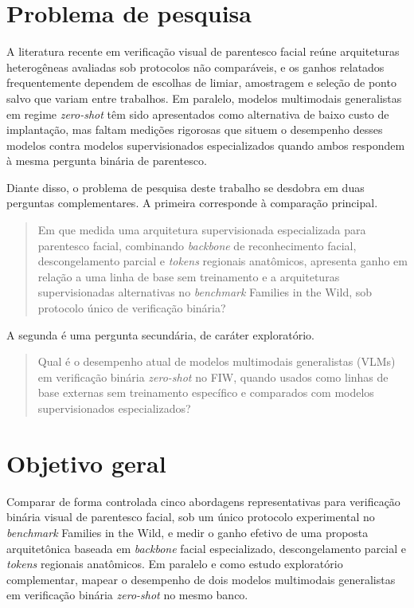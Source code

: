 \section{Problema de pesquisa}

A literatura recente em verificação visual de parentesco facial reúne arquiteturas heterogêneas avaliadas sob protocolos não comparáveis, e os ganhos relatados frequentemente dependem de escolhas de limiar, amostragem e seleção de ponto salvo que variam entre trabalhos. Em paralelo, modelos multimodais generalistas em regime \textit{zero-shot} têm sido apresentados como alternativa de baixo custo de implantação, mas faltam medições rigorosas que situem o desempenho desses modelos contra modelos supervisionados especializados quando ambos respondem à mesma pergunta binária de parentesco.

Diante disso, o problema de pesquisa deste trabalho se desdobra em duas perguntas complementares. A primeira corresponde à comparação principal.

\begin{quote}
\noindent Em que medida uma arquitetura supervisionada especializada para parentesco facial, combinando \textit{backbone} de reconhecimento facial, descongelamento parcial e \textit{tokens} regionais anatômicos, apresenta ganho em relação a uma linha de base sem treinamento e a arquiteturas supervisionadas alternativas no \textit{benchmark} Families in the Wild, sob protocolo único de verificação binária?
\end{quote}

A segunda é uma pergunta secundária, de caráter exploratório.

\begin{quote}
\noindent Qual é o desempenho atual de modelos multimodais generalistas (VLMs) em verificação binária \textit{zero-shot} no FIW, quando usados como linhas de base externas sem treinamento específico e comparados com modelos supervisionados especializados?
\end{quote}

\section{Objetivo geral}

Comparar de forma controlada cinco abordagens representativas para verificação binária visual de parentesco facial, sob um único protocolo experimental no \textit{benchmark} Families in the Wild, e medir o ganho efetivo de uma proposta arquitetônica baseada em \textit{backbone} facial especializado, descongelamento parcial e \textit{tokens} regionais anatômicos. Em paralelo e como estudo exploratório complementar, mapear o desempenho de dois modelos multimodais generalistas em verificação binária \textit{zero-shot} no mesmo banco.

